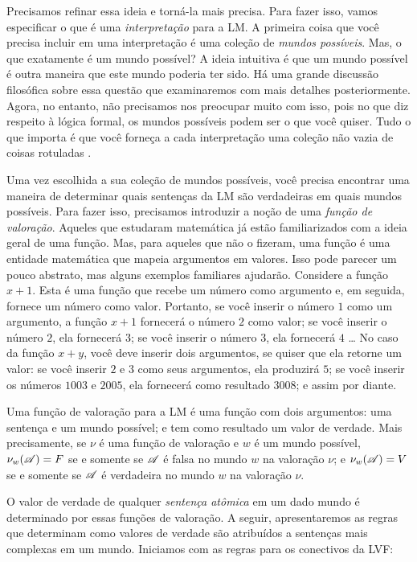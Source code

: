 Precisamos refinar essa ideia e torná-la mais precisa. Para fazer isso,  vamos especificar o que é uma  \emph{interpretação} para a LM. A primeira coisa que você precisa incluir em uma interpretação é uma coleção de \emph{mundos possíveis}. Mas, o que exatamente é um mundo possível? A ideia intuitiva é que um mundo possível é outra maneira que este mundo poderia ter sido. Há uma grande discussão filosófica sobre  essa questão que examinaremos com mais detalhes posteriormente. Agora, no entanto,  não precisamos nos preocupar muito com isso, pois no que diz respeito à lógica formal, os mundos possíveis podem ser o que você quiser. Tudo o que importa é que você forneça a cada interpretação uma coleção não vazia de coisas rotuladas .
 
Uma vez escolhida  a  sua coleção de mundos possíveis, você precisa encontrar uma maneira de determinar quais sentenças da LM são verdadeiras em quais mundos possíveis. Para fazer isso, precisamos introduzir a noção de uma \emph{função de valoração}. Aqueles que estudaram matemática já estão familiarizados com a ideia geral de uma função. Mas, para aqueles que não o fizeram, uma função é uma entidade matemática que mapeia argumentos em valores. Isso pode parecer um pouco abstrato, mas alguns exemplos familiares ajudarão. Considere a função $x + 1$. Esta é uma função que recebe um número como argumento e, em seguida, fornece um número como valor. Portanto, se você inserir o número $1$ como um argumento, a função $x + 1$ fornecerá o número $2$ como valor; se você inserir o número  $2$, ela fornecerá $3$; se você inserir o número  $3$, ela fornecerá $4$ \dots{}  No caso da função $x + y$, você deve inserir dois argumentos, se quiser que ela retorne um valor: se você inserir $2$ e $3$ como seus argumentos, ela produzirá $5$; se você inserir os números  $1003$ e $2005$, ela fornecerá como resultado $3008$; e assim por diante.

Uma função de valoração para a LM é uma função com dois argumentos:  uma sentença  e um mundo  possível;  e tem como resultado um valor de verdade.   
Mais precisamente, se $\nu$   é uma função de valoração  e $w$ é um mundo possível,   $\nu_w(\mathscr{A})=F$  se e somente se $\mathscr{A}$ é falsa no mundo $w$ na valoração $\nu$; e $\nu_w(\mathscr{A})=V$  se e somente se $\mathscr{A}$  é verdadeira no mundo $w$ na valoração $\nu$.

O valor de verdade de  qualquer \emph{sentença atômica} em um dado mundo é determinado por essas funções de valoração.  A seguir, apresentaremos as  regras   que determinam como valores de verdade são atribuídos a sentenças mais complexas em um mundo. Iniciamos com  as regras para os conectivos da  LVF:

